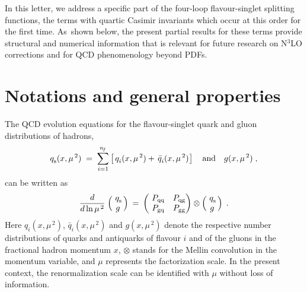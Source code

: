 \documentclass[12pt]{article}
\newcommand{\beq}{\begin{equation}}
\newcommand{\eeq}{\end{equation}}
\def\mus{{\mu^{\,2}}}
\begin{document}
In this letter, we address a specific part of the four-loop 
flavour-singlet splitting functions, the terms with quartic Casimir invariants 
which occur at this order for the first time.
As~shown below, the present partial results for these terms provide
structural and numerical information that is relevant for future research
on N$^3$LO corrections and for QCD phenomenology beyond PDFs.

%
\section{Notations and general properties}
\label{sec:genprops}
\setcounter{equation}{0}
\vspace*{-1mm}

The QCD evolution equations for the flavour-singlet quark and gluon 
distributions of hadrons,
%
%
\beq
\label{sgPDFs}
  q_{\rm s}^{}(x,\mus) \; = \; \sum_{i=1}^{n_{\!f}} \left[\,
  q_i^{}(x,\mus) + \,\bar{q}_i^{}(x,\mus) \:\!\right] 
\quad \mbox{and} \quad g(x,\mus)
\; , 
\eeq
%
can be written as
%
\beq
\label{sgEvol}
  \frac{d}{d \ln\mus} \; 
  \Big( \begin{array}{c} \! q_{\rm s}^{} \!\! \\ \!g\!  \end{array} \Big)
  \: = \: \left( 
  \begin{array}{cc} \! P_{\rm qq} & P_{\rm qg} \!\!\! \\
                    \! P_{\rm gq} & P_{\rm gg} \!\!\! \end{array} \right) 
  \otimes
  \Big( \begin{array}{c} \!q_{\rm s}^{}\!\! \\ \!g\!  \end{array} \Big)
  \:\: .
\eeq
%
Here $q_i^{}(x,\mus)$, $\bar{q}_i^{}(x,\mus)$ and $g(x,\mus)$ denote
the respective number distributions of quarks and antiquarks of flavour $i$ 
and of the gluons in the fractional hadron momentum $x$,
$\otimes$ stands for the Mellin convolution in the momentum variable,
and $\mu$ represents the factorization scale. 
In the present context, the renormalization scale can be identified with 
$\mu$ without loss of information.
\end{document}
